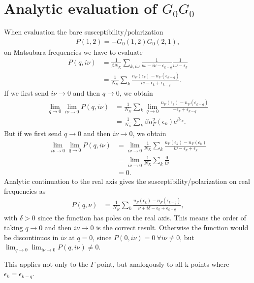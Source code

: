 \documentclass[12pt,a4paper]{scrartcl}
\numberwithin{equation}{section}
\begin{document}
\section{Analytic evaluation of $G_0G_0$}
When evaluation the bare susceptibility/polarization
\begin{align}
 P(1,2) = -G_0(1,2)G_0(2,1),
\end{align}
on Matsubara frequencies we have to evaluate
\begin{align}
 P(q,i\nu)
 &= \frac{1}{\beta N_K}\sum_{k,i\omega} \frac{1}{i\omega-i\nu - \epsilon_{k-q}}\frac{1}{i\omega - \epsilon_k } \\
 &= \frac{1}{N_K}\sum_k \frac{n_F(\epsilon_k)-n_F(\epsilon_{k-q})}{ i\nu - \epsilon_k+ \epsilon_{k-q} }.
\end{align}
If we first send $i\nu\rightarrow 0$ and then $q\rightarrow 0$, we obtain
\begin{align}
 \lim_{q\rightarrow 0}\lim_{i\nu\rightarrow 0}P(q,i\nu)
 &=\frac{1}{N_K}\sum_k  \lim_{q\rightarrow 0} \frac{n_F(\epsilon_k)-n_F(\epsilon_{k-q})}{  - \epsilon_k+ \epsilon_{k-q} }\\
 &=\frac{1}{N_K}\sum_k  \beta n^2_F(\epsilon_k)\mathrm{e}^{\beta \epsilon_k}.
\end{align}
But if we first send $q\rightarrow 0$ and then $i\nu\rightarrow 0$, we obtain
\begin{align}
 \lim_{i\nu\rightarrow 0} \lim_{q\rightarrow 0}P(q,i\nu)
 &=\lim_{i\nu\rightarrow 0} \frac{1}{N_K}\sum_k \frac{n_F(\epsilon_k)-n_F(\epsilon_{k})}{i\nu  - \epsilon_k+ \epsilon_{k} }\\
 &=\lim_{i\nu\rightarrow 0} \frac{1}{N_K}\sum_k \frac{0}{i\nu} \\
 &= 0.
\end{align}
Analytic continuation to the real axis gives the susceptibility/polarization on real frequencies as
\begin{align}
 P(q,\nu)
 &= \frac{1}{N_K}\sum_k \frac{n_F(\epsilon_k)-n_F(\epsilon_{k-q})}{ \nu+i\delta - \epsilon_k+ \epsilon_{k-q} },
\end{align}
with $\delta>0$ since the function has poles on the real axis. This means 
the order of taking $q\rightarrow 0$ and then $i\nu\rightarrow 0$ is the correct result.
Otherwise the function would be discontinuos in $i\nu$ at $q=0$, since 
$P(0,i\nu)=0 \ \forall i\nu\neq 0$, but $\lim_{q\rightarrow 0}\lim_{i\nu\rightarrow 0}P(q,i\nu) \neq 0$.

This applies not only to the $\Gamma$-point, but analogously to all k-points where $\epsilon_k=\epsilon_{k-q}$.
\end{document}
